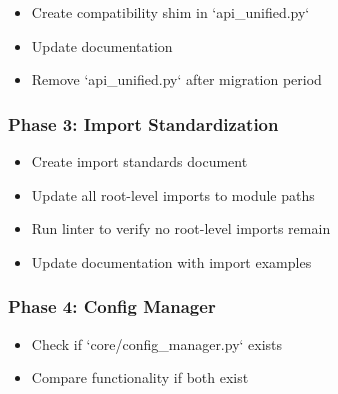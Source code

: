 \documentclass[11pt,a4paper]{article}
\begin{document}
\begin{itemize}
\item [ ] Create compatibility shim in `api_unified.py`
\end{itemize}

\begin{itemize}
\item [ ] Update documentation
\end{itemize}

\begin{itemize}
\item [ ] Remove `api_unified.py` after migration period
\end{itemize}

\subsubsection{Phase 3: Import Standardization}

\begin{itemize}
\item [ ] Create import standards document
\end{itemize}

\begin{itemize}
\item [ ] Update all root-level imports to module paths
\end{itemize}

\begin{itemize}
\item [ ] Run linter to verify no root-level imports remain
\end{itemize}

\begin{itemize}
\item [ ] Update documentation with import examples
\end{itemize}

\subsubsection{Phase 4: Config Manager}

\begin{itemize}
\item [ ] Check if `core/config_manager.py` exists
\end{itemize}

\begin{itemize}
\item [ ] Compare functionality if both exist
\end{itemize}
\end{document}
